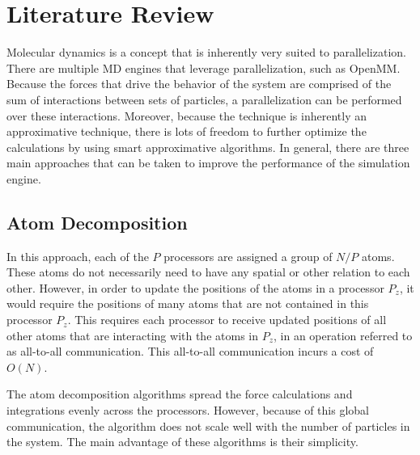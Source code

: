 \documentclass[conference]{IEEEtran}
\begin{document}
\section{Literature Review}
    Molecular dynamics is a concept that is inherently very suited to parallelization. There are multiple
    MD engines that leverage parallelization, such as OpenMM.~\cite{eastman2010openmm} Because the forces that
    drive the behavior of the system are comprised of the sum of interactions between sets of particles, a parallelization
    can be performed over these interactions. Moreover, because the technique is inherently an approximative technique,
    there is lots of freedom to further optimize the calculations by using smart approximative algorithms. 
    In general, there are three main approaches that can be taken to improve the performance of the
    simulation engine. 

    \subsection{Atom Decomposition}
    In this approach, each of the $P$ processors are assigned a group of $N/P$ atoms. These atoms do not necessarily
    need to have any spatial or other relation to each other. However, in order to update the positions of the atoms
    in a processor $P_z$, it would require the positions of many atoms that are not contained in this processor
    $P_z$. This requires each processor to receive updated positions of all other atoms that are interacting with
    the atoms in $P_z$, in an operation referred to as all-to-all communication. This all-to-all communication incurs
    a cost of $O(N)$.~\cite{plimpton1995fast, fox1989solving}
    
    The atom decomposition algorithms
    spread the force calculations and integrations evenly across the processors. However, because of this global
    communication, the algorithm does not scale well with the number of particles in the system. The main advantage
    of these algorithms is their simplicity.~\cite{plimpton1995fast, fox1989solving}
\end{document}
